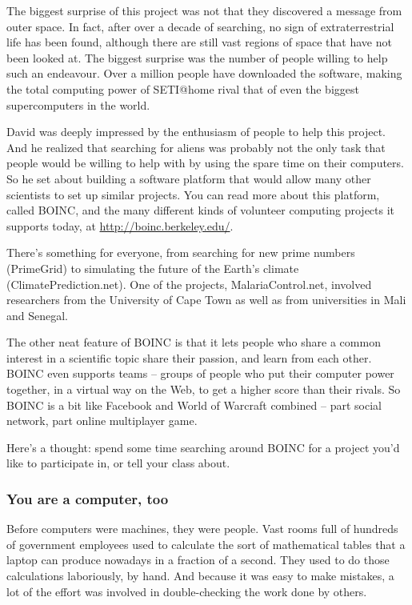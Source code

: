 The biggest surprise of this project was not that they discovered a message from outer space. In fact, after over a decade of searching, no sign of extraterrestrial life has been found, although there are still vast regions of space that have not been looked at. The biggest surprise was the number of people willing to help such an endeavour. Over a million people have downloaded the software, making the total computing power of SETI@home rival that of even the biggest supercomputers in the world.

David was deeply impressed by the enthusiasm of people to help this project. And he realized that searching for aliens was probably not the only task that people would be willing to help with by using the spare time on their computers. So he set about building a software platform that would allow many other scientists to set up similar projects. You can read more about this platform, called BOINC, and the many different kinds of volunteer computing projects it supports today, at \url{http://boinc.berkeley.edu/}. \par

There’s something for everyone, from searching for new prime numbers (PrimeGrid) to simulating the future of the Earth’s climate (ClimatePrediction.net). One of the projects, MalariaControl.net, involved researchers from the University of Cape Town as well as from universities in Mali and Senegal. \par

The other neat feature of BOINC is that it lets people who share a common interest in a scientific topic share their passion, and learn from each other. BOINC even supports teams – groups of people who put their computer power together, in a virtual way on the Web, to get a higher score than their rivals. So BOINC is a bit like Facebook and World of Warcraft combined – part social network, part online multiplayer game.\par

Here’s a thought: spend some time searching around BOINC for a project you’d like to participate in, or tell your class about. 

\subsubsection{You are a computer, too}
Before computers were machines, they were people. Vast rooms full of hundreds of government employees used to calculate the sort of mathematical tables that a laptop can produce nowadays in a fraction of a second. They used to do those calculations laboriously, by hand. And because it was easy to make mistakes, a lot of the effort was involved in double-checking the work done by others. \par

